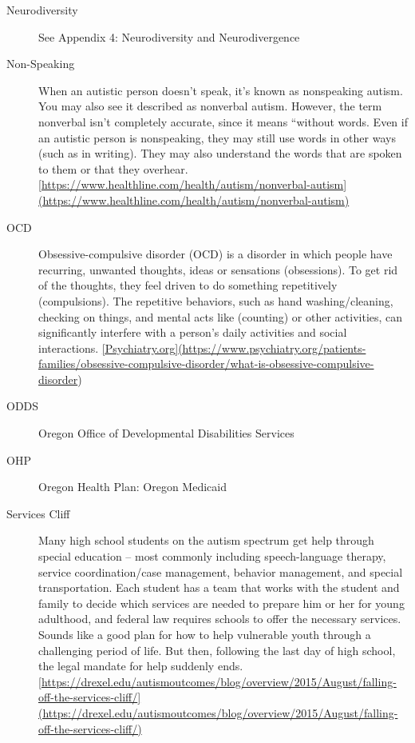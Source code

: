 \documentclass[
  letterpaper,
  DIV=11,
  numbers=noendperiod]{scrreprt}
\begin{document}
\begin{description}
\item[Neurodiversity]
See Appendix 4: Neurodiversity and Neurodivergence
\item[Non-Speaking]
When an autistic person doesn't speak, it's known as nonspeaking autism.
You may also see it described as nonverbal autism. However, the term
nonverbal isn't completely accurate, since it means ``without words.
Even if an autistic person is nonspeaking, they may still use words in
other ways (such as in writing). They may also understand the words that
are spoken to them or that they overhear.
\href{https://www.healthline.com/health/autism/nonverbal-autism\%5D(https://www.healthline.com/health/autism/nonverbal-autism)}{{[}https://www.healthline.com/health/autism/nonverbal-autism{]}(https://www.healthline.com/health/autism/nonverbal-autism)}
\item[OCD]
Obsessive-compulsive disorder (OCD) is a disorder in which people have
recurring, unwanted thoughts, ideas or sensations (obsessions). To get
rid of the thoughts, they feel driven to do something repetitively
(compulsions). The repetitive behaviors, such as hand washing/cleaning,
checking on things, and mental acts like (counting) or other activities,
can significantly interfere with a person's daily activities and social
interactions.
\href{https://www.psychiatry.org/patients-families/obsessive-compulsive-disorder/what-is-obsessive-compulsive-disorder}{{[}Psychiatry.org{]}(https://www.psychiatry.org/patients-families/obsessive-compulsive-disorder/what-is-obsessive-compulsive-disorder})
\item[ODDS]
Oregon Office of Developmental Disabilities Services
\item[OHP]
Oregon Health Plan: Oregon Medicaid
\item[Services Cliff]
Many high school students on the autism spectrum get help through
special education -- most commonly including speech-language therapy,
service coordination/case management, behavior management, and special
transportation. Each student has a team that works with the student and
family to decide which services are needed to prepare him or her for
young adulthood, and federal law requires schools to offer the necessary
services. Sounds like a good plan for how to help vulnerable youth
through a challenging period of life. But then, following the last day
of high school, the legal mandate for help suddenly ends.
\href{https://drexel.edu/autismoutcomes/blog/overview/2015/August/falling-off-the-services-cliff/\%5D(https://drexel.edu/autismoutcomes/blog/overview/2015/August/falling-off-the-services-cliff/)}{{[}https://drexel.edu/autismoutcomes/blog/overview/2015/August/falling-off-the-services-cliff/{]}(https://drexel.edu/autismoutcomes/blog/overview/2015/August/falling-off-the-services-cliff/)}

\end{description}
\end{document}
